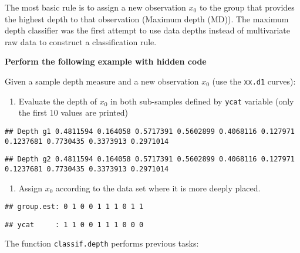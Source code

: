 \documentclass[
]{book}
\newenvironment{Shaded}{\begin{snugshade}}{\end{snugshade}}
\newcommand{\AttributeTok}[1]{\textcolor[rgb]{0.77,0.63,0.00}{#1}}
\newcommand{\DecValTok}[1]{\textcolor[rgb]{0.00,0.00,0.81}{#1}}
\newcommand{\FunctionTok}[1]{\textcolor[rgb]{0.00,0.00,0.00}{#1}}
\newcommand{\NormalTok}[1]{#1}
\newcommand{\OtherTok}[1]{\textcolor[rgb]{0.56,0.35,0.01}{#1}}
\newcommand{\SpecialCharTok}[1]{\textcolor[rgb]{0.00,0.00,0.00}{#1}}
\newcommand{\StringTok}[1]{\textcolor[rgb]{0.31,0.60,0.02}{#1}}
\providecommand{\tightlist}{%
  \setlength{\itemsep}{0pt}\setlength{\parskip}{0pt}}
\begin{document}
The most basic rule is to assign a new observation \(x_0\) to the group that provides the highest depth to that observation (Maximum depth (MD)). The maximum depth classifier was the first attempt to use data depths instead of multivariate raw data to construct a classification rule.

\textbf{Perform the following example with hidden code}

Given a sample depth measure and a new observation \(x_0\) (use the \texttt{xx.d1} curves):

\begin{enumerate}
\def\labelenumi{\arabic{enumi}.}
\tightlist
\item
  Evaluate the depth of \(x_0\) in both sub-samples defined by \texttt{ycat} variable (only the first 10 values are printed)
\end{enumerate}

\begin{verbatim}
## Depth g1 0.4811594 0.164058 0.5717391 0.5602899 0.4068116 0.127971 0.1237681 0.7730435 0.3373913 0.2971014
\end{verbatim}

\begin{verbatim}
## Depth g2 0.4811594 0.164058 0.5717391 0.5602899 0.4068116 0.127971 0.1237681 0.7730435 0.3373913 0.2971014
\end{verbatim}

\begin{enumerate}
\def\labelenumi{\arabic{enumi}.}
\setcounter{enumi}{1}
\tightlist
\item
  Assign \(x_0\) according to the data set where it is more deeply placed.
\end{enumerate}

\begin{verbatim}
## group.est: 0 1 0 0 1 1 1 0 1 1
\end{verbatim}

\begin{verbatim}
## ycat     : 1 1 0 0 1 1 1 0 0 0
\end{verbatim}

The function \texttt{classif.depth} performs previous tasks:

\begin{Shaded}
\end{Shaded}
\end{document}
